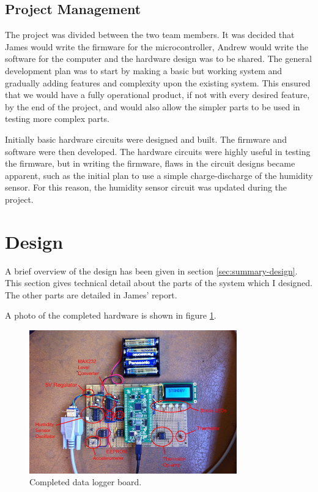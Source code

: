 \documentclass[a4paper,10pt]{article}  %
\begin{document}
\subsection{Project Management}
\label{sec:project-management}

The project was divided between the two team members. It was decided
that James would write the firmware for the microcontroller, Andrew
would write the software for the computer and the hardware design was
to be shared. The general development plan was to start by making a
basic but working system and gradually adding features and complexity
upon the existing system. This ensured that we would have a fully
operational product, if not with every desired feature, by the end of
the project, and would also allow the simpler parts to be used in
testing more complex parts.

Initially basic hardware circuits were designed and built. The firmware
and software were then developed. The hardware circuits were highly
useful in testing the firmware, but in writing the firmware, flaws in
the circuit designs became apparent, such as the initial plan to use a
simple charge-discharge of the humidity sensor. For this reason, the
humidity sensor circuit was updated during the project.

\section{Design}
\label{sec:design}

A brief overview of the design has been given in section
\ref{sec:summary-design}. This section gives technical detail about
the parts of the system which I designed. The other parts are detailed
in James' report.

A photo of the completed hardware is shown in figure \ref{fig:boardphoto}.
\begin{figure}[!htb]
  \begin{center}
    \includegraphics[width=0.8\textwidth]{completedboard_annotated.png}
  \end{center}
  \caption{Completed data logger board.}
  \label{fig:boardphoto}
\end{figure}
\end{document}
